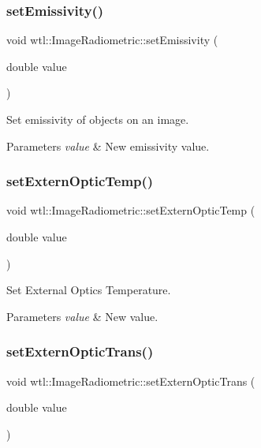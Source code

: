 \subsubsection{\texorpdfstring{set\+Emissivity()}{setEmissivity()}}
{\footnotesize\ttfamily void wtl\+::\+Image\+Radiometric\+::set\+Emissivity (\begin{DoxyParamCaption}\item[{double}]{value }\end{DoxyParamCaption})}



Set emissivity of objects on an image. 


\begin{DoxyParams}{Parameters}
{\em value} & New emissivity value. \\
\hline
\end{DoxyParams}
\mbox{\label{classwtl_1_1_image_radiometric_a94a4ff1210b47b3952f5996f1de591da}} 
\subsubsection{\texorpdfstring{set\+Extern\+Optic\+Temp()}{setExternOpticTemp()}}
{\footnotesize\ttfamily void wtl\+::\+Image\+Radiometric\+::set\+Extern\+Optic\+Temp (\begin{DoxyParamCaption}\item[{double}]{value }\end{DoxyParamCaption})}



Set External Optics Temperature. 


\begin{DoxyParams}{Parameters}
{\em value} & New value. \\
\hline
\end{DoxyParams}
\mbox{\label{classwtl_1_1_image_radiometric_af7382abba74ae6803928d636d8cd4c5a}} 
\subsubsection{\texorpdfstring{set\+Extern\+Optic\+Trans()}{setExternOpticTrans()}}
{\footnotesize\ttfamily void wtl\+::\+Image\+Radiometric\+::set\+Extern\+Optic\+Trans (\begin{DoxyParamCaption}\item[{double}]{value }\end{DoxyParamCaption})}



